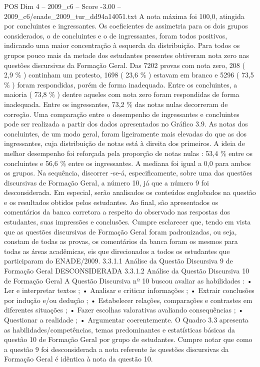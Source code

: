 \begin{textsample}{POS Dim 4 – 2009\_c6 – Score -3.00 – 2009\_c6/enade\_2009\_tur\_dd94a14051.txt}
A nota máxima foi 100,0, atingida por concluintes e ingressantes.
Os coeficientes de assimetria para os dois grupos considerados, o de concluintes e o de ingressantes, foram todos positivos, indicando uma maior concentração à esquerda da distribuição.
Para todos os grupos pouco mais da metade dos estudantes presentes obtiveram nota zero nas questões discursivas da Formação Geral.
Das 7202 provas com nota zero, 208 ( 2,9 \% ) continham um protesto, 1698 ( 23,6 \% ) estavam em branco e 5296 ( 73,5 \% ) foram respondidas, porém de forma inadequada.
Entre os concluintes, a maioria ( 73,8 \% ) dentre aqueles com nota zero foram respondidas de forma inadequada.
Entre os ingressantes, 73,2 \% das notas nulas decorreram de correção.
Uma comparação entre o desempenho de ingressantes e concluintes pode ser realizada a partir dos dados apresentados no Gráfico 3.9.
As notas dos concluintes, de um modo geral, foram ligeiramente mais elevadas do que as dos ingressantes, cuja distribuição de notas está à direita dos primeiros.
A ideia de melhor desempenho foi reforçada pela proporção de notas nulas : 53,4 \% entre os concluintes e 56,6 \% entre os ingressantes.
A mediana foi igual a 0,0 para ambos os grupos.
Na sequência, discorrer -se-á, especificamente, sobre uma das questões discursivas de Formação Geral, a número 10, já que a número 9 foi desconsiderada.
Em especial, serão analisados os conteúdos englobados na questão e os resultados obtidos pelos estudantes.
Ao final, são apresentados os comentários da banca corretora a respeito do observado nas respostas dos estudantes, suas impressões e conclusões.
Cumpre esclarecer que, tendo em vista que as questões discursivas de Formação Geral foram padronizadas, ou seja, constam de todas as provas, os comentários da banca foram os mesmos para todas as áreas acadêmicas, eis que direcionados a todos os estudantes que participaram do ENADE/2009. 3.3.1.1 Análise da Questão Discursiva 9 de Formação Geral DESCONSIDERADA 3.3.1.2 Análise da Questão Discursiva 10 de Formação Geral A Questão Discursiva nº 10 buscou avaliar as habilidades : • Ler e interpretar textos ; • Analisar e criticar informações ; • Extrair conclusões por indução e/ou dedução ; • Estabelecer relações, comparações e contrastes em diferentes situações ; • Fazer escolhas valorativas avaliando consequências ; • Questionar a realidade ; • Argumentar coerentemente.
O Quadro 3.3 apresenta as habilidades/competências, temas predominantes e estatísticas básicas da questão 10 de Formação Geral por grupo de estudantes.
Cumpre notar que como a questão 9 foi desconsiderada a nota referente às questões discursivas da Formação Geral é idêntica à nota da questão 10.

\end{textsample}
